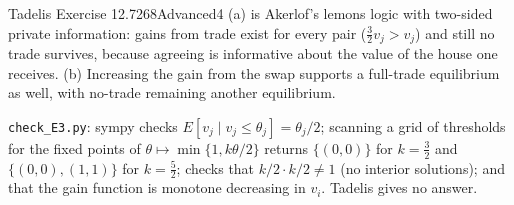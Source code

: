 \begin{exsol}{Tadelis Exercise 12.7}{268}{Advanced}{4}
\interp (a) is Akerlof's lemons logic with two-sided private information: gains from trade
exist for every pair ($\tfrac32v_j>v_j$) and still no trade survives, because agreeing is
informative about the value of the house one receives. (b) Increasing the gain from the swap
supports a full-trade equilibrium as well, with no-trade remaining another equilibrium.

\verify \texttt{check\_E3.py}: sympy checks $E[v_j\mid v_j\le\theta_j]=\theta_j/2$; scanning a grid of thresholds for the fixed
points of $\theta\mapsto\min\{1,k\theta/2\}$ returns $\{(0,0)\}$ for $k=\tfrac32$ and
$\{(0,0),(1,1)\}$ for $k=\tfrac52$; checks that $k/2\cdot k/2\ne1$ (no interior solutions); and that the gain
function is monotone decreasing in $v_i$. Tadelis gives no answer.

\end{exsol}
